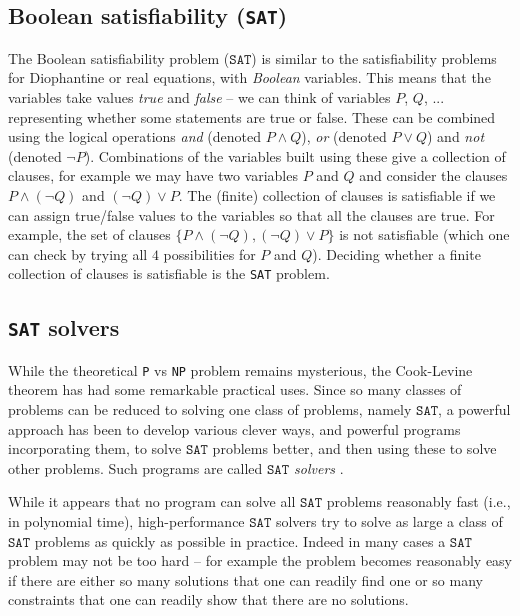 \documentclass{amsart}
\theoremstyle{plain}
\theoremstyle{definition}
\theoremstyle{remark}
\begin{document}
\subsection{Boolean satisfiability (\texttt{SAT})}

The Boolean satisfiability problem (\(\texttt{SAT}\)) is similar to the satisfiability
problems for Diophantine or real equations, with \emph{Boolean} variables.
This means that the variables take values \emph{true} and \emph{false} -- we
can think of variables $P$, $Q$, ... representing whether some statements are
true or false. These can be combined using the logical operations \emph{and}
(denoted $P\wedge Q$), \emph{or} (denoted $P\vee Q$) and \emph{not} (denoted $\neg P$).
Combinations of the variables built using these give a collection of clauses, for example we
may have two variables $P$ and $Q$ and consider the clauses $P\wedge(\neg Q)$ and $(\neg Q)\vee P$.
The (finite) collection of clauses is satisfiable if we can assign true/false values to the variables
so that all the clauses are true. For example, the set of clauses $\{P\wedge(\neg Q), (\neg Q)\vee P\}$
is not satisfiable (which one can check by trying all $4$ possibilities for $P$ and $Q$).
Deciding whether a finite collection of clauses is satisfiable is
the \texttt{SAT} problem.


\subsection{\texttt{SAT} solvers}\label{sat-solvers}

While the theoretical \texttt{P} vs \texttt{NP} problem remains mysterious, the
Cook-Levine theorem has had some remarkable practical uses. Since so
many classes of problems can be reduced to solving one class of
problems, namely \(\texttt{SAT}\), a powerful approach has been to develop
various clever ways, and powerful programs incorporating them, to solve
\(\texttt{SAT}\) problems better, and then using these to solve other problems.
Such programs are called \emph{\(\texttt{SAT}\) solvers} .


While it appears that no program can solve all \(\texttt{SAT}\) problems
reasonably fast (i.e., in polynomial time), high-performance \(\texttt{SAT}\)
solvers try to solve as large a class of \(\texttt{SAT}\) problems as quickly as
possible in practice. Indeed in many cases a \(\texttt{SAT}\) problem may not be too
hard -- for example the problem becomes reasonably easy if there are either so
many solutions that one can readily find one or so many constraints that
one can readily show that there are no solutions.
\end{document}
